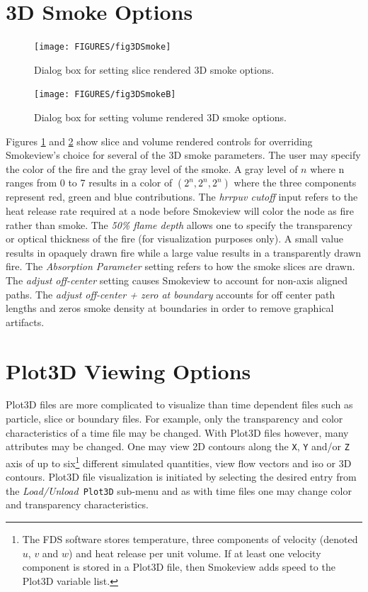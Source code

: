 \documentclass[11pt,twoside]{book}
\begin{document}
\section{3D Smoke Options}
\begin{figure}[\figoptions]
\centerline{\texttt{[image: FIGURES/fig3DSmoke]}
} \caption[Dialog Box for setting slice rendered 3D smoke options]
{Dialog box for setting slice rendered 3D smoke options.   }
\label{fig3DSmoke}
\end{figure}
\begin{figure}[\figoptions]
\centerline{\texttt{[image: FIGURES/fig3DSmokeB]}
} \caption[Dialog Box for setting volume rendered 3D smoke
options] {Dialog box for setting volume rendered 3D smoke options.
} \label{fig3DSmokeB}
\end{figure}
Figures \ref{fig3DSmoke} and \ref{fig3DSmokeB} show slice and
volume rendered controls for overriding Smokeview's choice for
several of the 3D smoke parameters.  The user may specify the
color of the fire and the gray level of the smoke.  A gray level
of $n$ where n ranges from 0 to 7 results in a color of
$(2^n,2^n,2^n)$ where the three components represent red, green
and blue contributions.  The {\em hrrpuv cutoff} input refers to
the heat release rate required at a node before Smokeview will
color the node as fire rather than smoke. The {\em 50\% flame
depth} allows one to specify the transparency or optical thickness
of the fire (for visualization purposes only). A small value
results in opaquely drawn fire while a large value results in a
transparently drawn fire. The {\em Absorption Parameter} setting
refers to how the smoke slices are drawn.  The {\em adjust
off-center} setting causes Smokeview to account for non-axis
aligned paths. The {\em adjust off-center + zero at boundary}
accounts for off center path lengths and zeros smoke density at
boundaries in order to remove graphical artifacts.


\section{Plot3D Viewing Options} Plot3D files are more
complicated to visualize than time dependent files such as
particle, slice or boundary files. For example, only the
transparency and color characteristics of a time file may be
changed. With Plot3D files however, many attributes may be
changed. One may view 2D contours along the {\tt X}, {\tt Y}
and/or {\tt Z} axis of up to six\footnote{ The FDS software stores
temperature, three components of velocity (denoted $u$, $v$ and
$w$) and heat release per unit volume.  If at least one velocity
component is stored in a Plot3D file, then Smokeview adds speed to
the Plot3D variable list.} different simulated quantities, view
flow vectors and iso or 3D contours. Plot3D file visualization is
initiated by selecting the desired entry from the {\em
Load/Unload}\ {\tt Plot3D} sub-menu and as with time files one may
change color and transparency characteristics.
\end{document}
